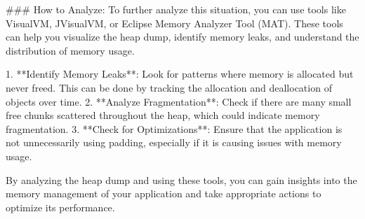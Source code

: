 ### How to Analyze:
To further analyze this situation, you can use tools like VisualVM, JVisualVM, or Eclipse Memory Analyzer Tool (MAT). These tools can help you visualize the heap dump, identify memory leaks, and understand the distribution of memory usage.

1. **Identify Memory Leaks**: Look for patterns where memory is allocated but never freed. This can be done by tracking the allocation and deallocation of objects over time.
2. **Analyze Fragmentation**: Check if there are many small free chunks scattered throughout the heap, which could indicate memory fragmentation.
3. **Check for Optimizations**: Ensure that the application is not unnecessarily using padding, especially if it is causing issues with memory usage.

By analyzing the heap dump and using these tools, you can gain insights into the memory management of your application and take appropriate actions to optimize its performance.